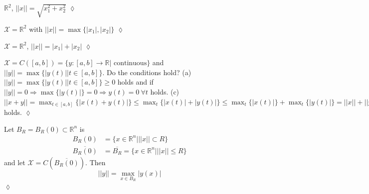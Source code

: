 \begin{example}
$\mathbb{R}^2$, $||x||=\sqrt{x_1^2+x_2^2}$
$\lozenge$
\end{example}

\begin{example}
$\mathcal{X}=\mathbb{R}^2$ with $||x|| = \max\{|x_1|,|x_2|\}$
$\lozenge$
\end{example}

\begin{example}
$\mathcal{X} = \mathbb{R}^2$, $||x||=|x_1|+|x_2|$
$\lozenge$
\end{example}

\begin{example}
$\mathcal{X} = C([a,b]) = \{y:[a,b]\to\mathbb{R} | \text{~continuous}\}$ and $||y|| = \max\{|y(t)| | t\in[a,b]\}$.
Do the conditions hold?
\newline
(a) $||y|| = \max\{|y(t)| | t\in[a,b]\}\geq 0$ holds and if $||y||=0 \Rightarrow \max\{|y(t)|\} = 0 \Rightarrow y(t)=0~\forall t$ holds.
\newline
(c) $||x+y|| = \max_{t\in[a,b]}\{|x(t)+y(t)|\} \leq \max_t\{|x(t)|+|y(t)|\} \leq \max_t\{|x(t)|\} + \max_t\{|y(t)|\} = ||x|| + ||y||$ holds.
$\lozenge$
\end{example}

\begin{example}
Let $B_R=B_R(0)\subset\mathbb{R}^n$ is
\begin{align*}
B_R(0) &= \{x\in\mathbb{R}^n | ||x||\subset R\} \\
\overline{B_R(0)} &= \overline{B_R} = \{x\in\mathbb{R}^n | ||x||\leq R\}
\end{align*}
and let $\mathcal{X}=C(\overline{B_R(0)})$.
Then
$$||y||=\max_{x\in B_R} |y(x)|$$
$\lozenge$
\end{example}%
